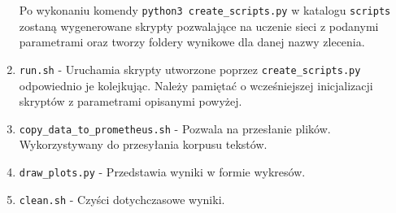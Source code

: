 \begin{enumerate}
	Po wykonaniu komendy \texttt{python3 create\_scripts.py} w katalogu \texttt{scripts} zostaną 
	wygenerowane skrypty pozwalające na uczenie sieci z podanymi parametrami oraz tworzy foldery 
	wynikowe dla danej nazwy zlecenia.
	
	
	
	\item {\texttt{run.sh} } - 
	Uruchamia skrypty utworzone poprzez \texttt{create\_scripts.py} odpowiednio je kolejkując. Należy
	pamiętać o wcześniejszej inicjalizacji skryptów z parametrami opisanymi powyżej.
	
	\item {\texttt{copy\_data\_to\_prometheus.sh} } - 
	Pozwala na przesłanie plików. Wykorzystywany do przesyłania korpusu tekstów.
	
	\item {\texttt{draw\_plots.py} } -
	Przedstawia wyniki w formie wykresów.
	
	\item {\texttt{clean.sh} } -
	Czyści dotychczasowe wyniki.
	
	
	
\end{enumerate}



